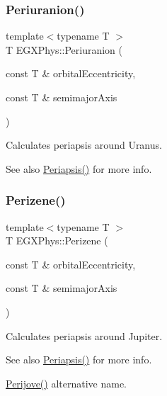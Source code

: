 \subsubsection{\texorpdfstring{Periuranion()}{Periuranion()}}
{\footnotesize\ttfamily template$<$typename T $>$ \\
T E\+G\+X\+Phys\+::\+Periuranion (\begin{DoxyParamCaption}\item[{const T \&}]{orbital\+Eccentricity,  }\item[{const T \&}]{semimajor\+Axis }\end{DoxyParamCaption})}



Calculates periapsis around Uranus. 

\begin{DoxySeeAlso}{See also}
\mbox{\hyperlink{group___periapsis_ga4414ac75539371ec874a3d25cad6c9fe}{Periapsis()}} for more info. 
\end{DoxySeeAlso}
\mbox{\label{group___periapsis_ga0523c65b7fc26e675388b2c3d38aa00b}} 
\subsubsection{\texorpdfstring{Perizene()}{Perizene()}}
{\footnotesize\ttfamily template$<$typename T $>$ \\
T E\+G\+X\+Phys\+::\+Perizene (\begin{DoxyParamCaption}\item[{const T \&}]{orbital\+Eccentricity,  }\item[{const T \&}]{semimajor\+Axis }\end{DoxyParamCaption})}



Calculates periapsis around Jupiter. 

\begin{DoxySeeAlso}{See also}
\mbox{\hyperlink{group___periapsis_ga4414ac75539371ec874a3d25cad6c9fe}{Periapsis()}} for more info. 

\mbox{\hyperlink{group___periapsis_ga075052f7ff9aa1d5fdf4501b493be86b}{Perijove()}} alternative name. 
\end{DoxySeeAlso}
